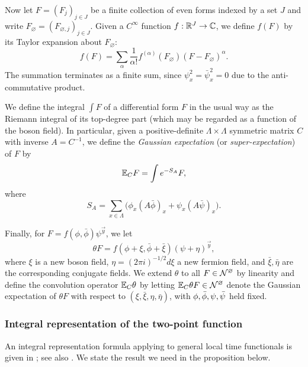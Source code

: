 Now let $F = (F_j)_{j \in J}$ be a finite collection of even forms
indexed by a set $J$
and write $F_\varnothing = (F_{\varnothing,j})_{j \in J}$.
Given a $C^\infty$ function $f : {\mathbb R}^J \rightarrow \mathbb{C}$, we define
$f(F)$ by its Taylor expansion about $F_\varnothing$:
\begin{equation}
f(F) = \sum_\alpha \frac{1}{\alpha!} f^{(\alpha)}(F_\varnothing) (F - F_\varnothing)^\alpha.
\end{equation}
The summation terminates as a finite sum,
since $\psi_x^2 = \bar\psi_x^2 = 0$ due to the anti-commut\-ative product.

We define the integral
$\int F$
of a differential form $F$ in the usual way
as the Riemann integral of its top-degree part
(which may be regarded as a function
of the boson field).
In particular, given a positive-definite
$\Lambda \times \Lambda$ symmetric matrix $C$
with inverse $A = C^{-1}$,
we define the \emph{Gaussian expectation}
(or \emph{super-expectation}) of $F$ by
\begin{equation}
\lbeq{ExCF}
\Ex_C F = \int e^{-S_A} F,
\end{equation}
where
\begin{equation}
\label{e:action}
S_A = \sum_{x\in\Lambda} \Big(\phi_x (A\bar\phi)_x + \psi_x (A \bar\psi)_x\Big).
\end{equation}

Finally, for $F = f(\phi, \bar\phi) \psi^{\vec y}$,
we let
\begin{equation}
\theta F = f(\phi + \xi, \bar\phi + \bar\xi) (\psi + \eta)^{\vec y},
\end{equation}
where $\xi$ is a new boson field, $\eta = (2\pi i)^{-1/2} d\xi$ a new fermion field,
and $\bar\xi, \bar\eta$ are the corresponding conjugate fields.
We extend $\theta$ to all $F \in \mathcal{N}^\varnothing$ by linearity
and define the convolution operator $\mathbb{E}_C\theta$ by letting
$\mathbb{E}_C\theta F \in \mathcal{N}^\varnothing$ denote the Gaussian expectation of $\theta F$ with respect
to $(\xi, \bar\xi, \eta, \bar\eta)$, with $\phi,\bar\phi,\psi,\bar\psi$ held fixed.

\subsubsection{Integral representation of the two-point function}
\label{sec:Gintrep}

An integral representation formula applying to general local time functionals
is given in \cite{BEI92,BIS09}; see also \cite[Appendix~A]{ST-phi4}.
We state the result we need in the proposition below.

